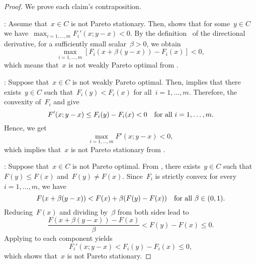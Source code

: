 \documentclass[../main]{subfiles}
\begin{document}
\begin{proof}
    We prove each claim's contraposition.

    :
    Assume that~$x \in C$ is not Pareto stationary.
    Then,  shows that for some~$y \in C$ we have~$\max_{i = 1, \dots, m} F_i'(x; y - x) < 0$.
    By the definition~ of the directional derivative, for a sufficiently small scalar~$\beta > 0$, we obtain
    \begin{equation}
        \max_{i = 1, \dots, m} [ F_i(x + \beta (y - x)) - F_i(x) ] < 0 
    ,\end{equation} 
    which means that~$x$ is not weakly Pareto optimal from .

    :
    Suppose that~$x \in C$ is not weakly Pareto optimal.
    Then,  implies that there exists~$y \in C$ such that~$F_i(y) < F_i(x)$ for all~$i = 1, \dots, m$.
    Therefore, the convexity of~$F_i$ and  give
    \begin{equation}
        F'(x; y - x) \le F_i(y) - F_i(x) < 0 \quad \text{for all~$i = 1, \dots, m$}
    .\end{equation} 
    Hence, we get
    \begin{equation}
        \max_{i = 1, \dots, m} F'(x; y - x) < 0
    ,\end{equation} 
    which implies that~$x$ is not Pareto stationary from .

    :
    Suppose that~$x \in C$ is not Pareto optimal.
    From , there exists~$y \in C$ such that~$F(y) \le F(x)$ and~$F(y) \neq F(x)$.
    Since~$F_i$ is strictly convex for every~$i = 1, \dots, m$, we have
    \begin{equation}
        F(x + \beta(y - x)) < F(x) + \beta (F(y) - F(x)) \quad \text{for all~$\beta \in (0, 1)$}
    .\end{equation} 
    Reducing~$F(x)$ and dividing by~$\beta$ from both sides lead to
    \begin{equation}
        \frac{F(x + \beta(y - x)) - F(x)}{\beta} < F(y) - F(x) \le 0
    .\end{equation} 
    Applying  to each component yields
    \begin{equation}
        F_i'(x; y - x) < F_i(y) - F_i(x) \le 0
    ,\end{equation} 
    which shows that~$x$ is not Pareto stationary.
\end{proof}
\end{document}
